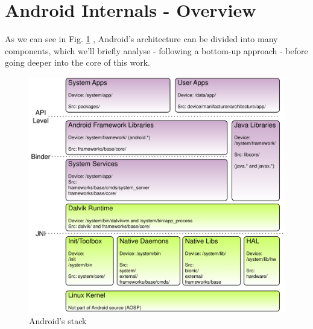 \section{Android Internals - Overview}
\label{overview}
As we can see in Fig. \ref{fig:stack} \cite{remixingand}, Android's architecture can be divided into many components, which we'll briefly analyse - following a bottom-up approach - before going deeper into the core of this work.
\begin{figure}[!htb]
	\centering
	\includegraphics[scale=.6]{images/stack.pdf}
	\caption{Android's stack}
	\label{fig:stack}
\end{figure}
